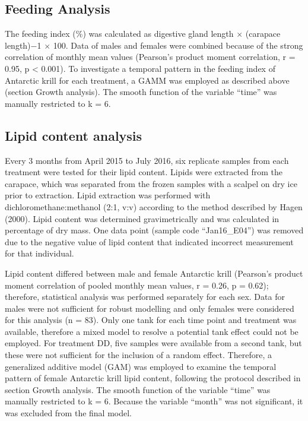 \subsection{Feeding Analysis}
The feeding index (\%) was calculated as digestive gland length $\times$ (carapace length)−1 $\times$ 100. Data of males and females were combined because of the strong correlation of monthly mean values (Pearson’s product moment correlation, r = 0.95, p < 0.001). To investigate a temporal pattern in the feeding index of Antarctic krill for each treatment, a GAMM was employed as described above (section Growth analysis). The smooth function of the variable “time” was manually restricted to k = 6.

\subsection{Lipid content analysis}
Every 3 months from April 2015 to July 2016, six replicate samples from each treatment were tested for their lipid content. Lipids were extracted from the carapace, which was separated from the frozen samples with a scalpel on dry ice prior to extraction. Lipid extraction was performed with dichloromethane:methanol (2:1, v:v) according to the method described by Hagen (2000). Lipid content was determined gravimetrically and was calculated in percentage of dry mass. One data point (sample code “Jan16\_E04”) was removed due to the negative value of lipid content that indicated incorrect measurement for that individual. 

Lipid content differed between male and female Antarctic krill (Pearson’s product moment correlation of pooled monthly mean values, r = 0.26, p = 0.62); therefore, statistical analysis was performed separately for each sex. Data for males were not sufficient for robust modelling and only females were considered for this analysis (n = 83). Only one tank for each time point and treatment was available, therefore a mixed model to resolve a potential tank effect could not be employed. For treatment DD, five samples were available from a second tank, but these were not sufficient for the inclusion of a random effect. Therefore, a generalized additive model (GAM) was employed to examine the temporal pattern of female Antarctic krill lipid content, following the protocol described in section Growth analysis. The smooth function of the variable “time” was manually restricted to k = 6. Because the variable “month” was not significant, it was excluded from the final model.

